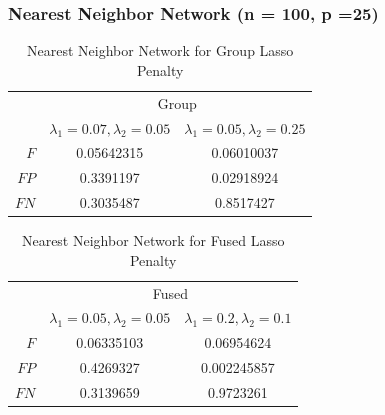 \documentclass[t]{beamer}
\begin{document}
\begin{frame}
\frametitle{Nearest Neighbor Network (n = 100, p =25)}
\begin{table}
\begin{center}
\begin{tabular}{r|c|c}
\toprule
&\multicolumn{2}{c}{Group}\\
&$\lambda_1 = 0.07,\lambda_2 = 0.05$&$\lambda_1 = 0.05,\lambda_2 = 0.25$\\
\midrule
$F$&0.05642315&0.06010037\\  
$FP$&0.3391197&0.02918924\\   
$FN$&0.3035487&0.8517427\\         
\bottomrule
\end{tabular}
\caption[]{Nearest Neighbor Network for Group Lasso Penalty}
\label{tab:compare1}
\end{center}
\end{table}

\begin{table}
\begin{center}
\begin{tabular}{r|c|c}
\toprule
&\multicolumn{2}{c}{Fused}\\
&$\lambda_1 = 0.05,\lambda_2 = 0.05$&$\lambda_1 = 0.2,\lambda_2 = 0.1$\\
\misrule
$F$&0.06335103&0.06954624\\  
$FP$&0.4269327&0.002245857\\   
$FN$&0.3139659&0.9723261\\         
\bottomrule
\end{tabular}
\caption[]{Nearest Neighbor Network for Fused Lasso Penalty}
\label{tab:compare2}
\end{center}
\end{table}
\end{frame}
\end{document}
